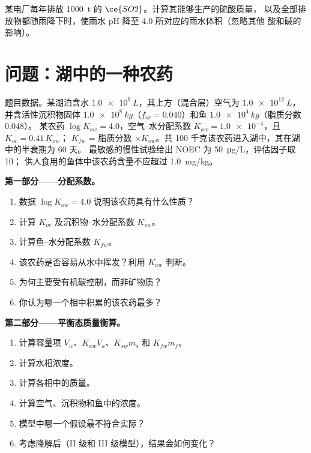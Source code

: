 \begin{exercise}[$\star\star\star$]\label{exo:b3:environmental-toxicology:12}
某电厂每年排放 \qty{1000}{t} 的 $\ce{SO2}$。计算其能够生产的硫酸质量，
以及全部排放物都随雨降下时，使雨水 pH 降至 4.0 所对应的雨水体积（忽略其他
酸和碱的影响）。
\end{exercise}

\section{问题：湖中的一种农药}

\begin{problem}
\label{pb:b3:environmental-toxicology:1}
题目数据。某湖泊含水 $\qty{1.0e9}{L}$，其上方（混合层）空气为 $\qty{1.0e12}{L}$，
并含活性沉积物固体 $\qty{1.0e8}{kg}$（$f_{oc} = 0.040$）和鱼 $\qty{1.0e4}{kg}$（脂质分数 0.048）。
某农药 $\log K_{ow} = 4.0$，空气–水分配系数 $K_{aw} = \num{1.0e-4}$，且 $K_{oc} = 0.41\,K_{ow}$；
$K_{fw}$ = 脂质分数 $\times K_{ow}$。共 100 千克该农药进入湖中，其在湖中的半衰期为 60 天。
最敏感的慢性试验给出 NOEC 为 \qty{50}{\micro g/L}，评估因子取 10；
供人食用的鱼体中该农药含量不应超过 \qty{1.0}{mg/kg}。

\medskip\noindent\textbf{第一部分——分配系数。}
\begin{enumerate}
  \item 数据 $\log K_{ow} = 4.0$ 说明该农药具有什么性质？
  \item 计算 $K_{oc}$ 及沉积物–水分配系数 $K_{sw}$。
  \item 计算鱼–水分配系数 $K_{fw}$。
  \item 该农药是否容易从水中挥发？利用 $K_{aw}$ 判断。
  \item 为何主要受有机碳控制，而非矿物质？
  \item 你认为哪一个相中积累的该农药最多？
\end{enumerate}

\medskip\noindent\textbf{第二部分——平衡态质量衡算。}
\begin{enumerate}[resume]
  \item 计算容量项 $V_w$、$K_{aw}V_a$、$K_{sw}m_s$ 和 $K_{fw}m_f$。
  \item 计算水相浓度。
  \item 计算各相中的质量。
  \item 计算空气、沉积物和鱼中的浓度。
  \item 模型中哪一个假设最不符合实际？
  \item 考虑降解后（II 级和 III 级模型），结果会如何变化？
\end{enumerate}


\end{problem}
